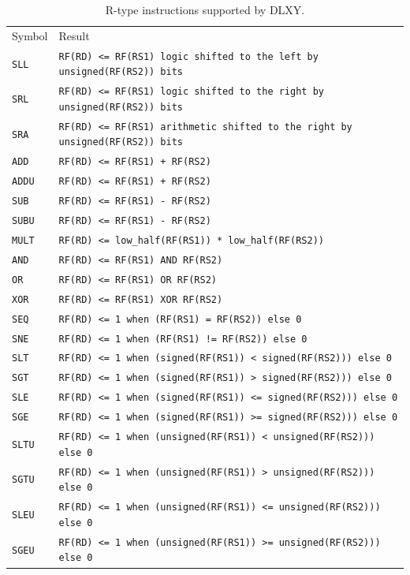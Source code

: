 \begin{table}[ht]
	\centering
	\begin{tabular}{ll}
		\hline
		\rowcolor{gray!50}
		Symbol & Result \\
		\texttt{SLL} & \texttt{RF(RD) <= RF(RS1) logic shifted to the left by unsigned(RF(RS2)) bits} \\
		\rowcolor{gray!25}
		\texttt{SRL} & \texttt{RF(RD) <= RF(RS1) logic shifted to the right by unsigned(RF(RS2)) bits} \\
		\texttt{SRA} & \texttt{RF(RD) <= RF(RS1) arithmetic shifted to the right by unsigned(RF(RS2)) bits} \\
		\rowcolor{gray!25}
		\texttt{ADD} & \texttt{RF(RD) <= RF(RS1) + RF(RS2)} \\
		\texttt{ADDU} & \texttt{RF(RD) <= RF(RS1) + RF(RS2)} \\
		\rowcolor{gray!25}
		\texttt{SUB} & \texttt{RF(RD) <= RF(RS1) - RF(RS2)} \\
		\texttt{SUBU} & \texttt{RF(RD) <= RF(RS1) - RF(RS2)} \\
		\rowcolor{gray!25}
		\texttt{MULT} & \texttt{RF(RD) <= low\_half(RF(RS1)) * low\_half(RF(RS2))} \\
		\texttt{AND} & \texttt{RF(RD) <= RF(RS1) AND RF(RS2)} \\
		\rowcolor{gray!25}
		\texttt{OR} & \texttt{RF(RD) <= RF(RS1) OR RF(RS2)} \\
		\texttt{XOR} & \texttt{RF(RD) <= RF(RS1) XOR RF(RS2)} \\
		\rowcolor{gray!25}
		\texttt{SEQ} & \texttt{RF(RD) <= 1 when (RF(RS1) = RF(RS2)) else 0} \\
		\texttt{SNE} & \texttt{RF(RD) <= 1 when (RF(RS1) != RF(RS2)) else 0} \\
		\rowcolor{gray!25}
		\texttt{SLT} & \texttt{RF(RD) <= 1 when (signed(RF(RS1)) < signed(RF(RS2))) else 0} \\
		\texttt{SGT} & \texttt{RF(RD) <= 1 when (signed(RF(RS1)) > signed(RF(RS2))) else 0} \\
		\rowcolor{gray!25}
		\texttt{SLE} & \texttt{RF(RD) <= 1 when (signed(RF(RS1)) <= signed(RF(RS2))) else 0} \\
		\texttt{SGE} & \texttt{RF(RD) <= 1 when (signed(RF(RS1)) >= signed(RF(RS2))) else 0} \\
		\rowcolor{gray!25}
		\texttt{SLTU} & \texttt{RF(RD) <= 1 when (unsigned(RF(RS1)) < unsigned(RF(RS2))) else 0} \\
		\texttt{SGTU} & \texttt{RF(RD) <= 1 when (unsigned(RF(RS1)) > unsigned(RF(RS2))) else 0} \\
		\rowcolor{gray!25}
		\texttt{SLEU} & \texttt{RF(RD) <= 1 when (unsigned(RF(RS1)) <= unsigned(RF(RS2))) else 0} \\
		\texttt{SGEU} & \texttt{RF(RD) <= 1 when (unsigned(RF(RS1)) >= unsigned(RF(RS2))) else 0} \\
		\hline
	\end{tabular}
	\caption{R-type instructions supported by DLXY.}
	\label{tab:r_type_inst}
\end{table}

